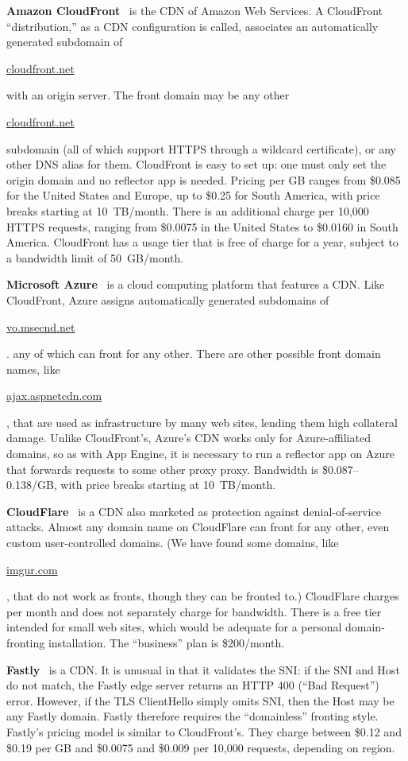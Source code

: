 \documentclass{sig-alternate}
\def\urll#1{\begin{NoHyper}\url{#1}\end{NoHyper}}
\begin{document}
\textbf{Amazon CloudFront}~\cite{cloudfront}
is the CDN of Amazon Web Services.
A CloudFront ``distribution,'' as a CDN configuration is called, associates
an automatically generated subdomain of \urll{cloudfront.net}
with an origin server.
The front domain may be any other \urll{cloudfront.net} subdomain
(all of which support HTTPS through a wildcard certificate),
or any other DNS alias for them.
CloudFront is easy to set up:
one must only set the origin domain and no reflector app is needed.
Pricing per GB ranges from \$0.085 for the United States and Europe,
up to \$0.25 for South America,
with price breaks starting at 10~TB/month.
There is an additional charge per 10,000 HTTPS requests,
ranging from \$0.0075 in the United States
to \$0.0160 in South America.
CloudFront has a usage tier that is free of charge for a year,
subject to a bandwidth limit of 50~GB/month.

\textbf{Microsoft Azure}~\cite{azure}
is a cloud computing platform that features a CDN.
Like CloudFront, Azure assigns automatically generated subdomains
of \urll{vo.msecnd.net}.
any of which can front for any other.
There are other possible front domain names, like \urll{ajax.aspnetcdn.com},
that are used as infrastructure by many web sites,
lending them high collateral damage.
Unlike CloudFront's, Azure's CDN works only for Azure-affiliated domains,
so as with App Engine, it is necessary to run a reflector app on Azure
that forwards requests to some other proxy proxy.
Bandwidth is \$0.087--0.138/GB, with price breaks starting at 10~TB/month.

\textbf{CloudFlare}~\cite{cloudflare}
is a CDN also marketed as protection against
denial-of-service attacks.
Almost any domain name on CloudFlare
can front for any other, even custom user-controlled domains.
(We have found some domains, like \urll{imgur.com},
that do not work as fronts, though they can be fronted to.)
CloudFlare charges per month and does not separately charge for bandwidth.
There is a free tier intended for small web sites,
which would be adequate for a personal domain-fronting installation.
The ``business'' plan is \$200/month.

\textbf{Fastly}~\cite{fastly} is a CDN.
It is unusual in that it validates the SNI:
if the SNI and Host do not match,
the Fastly edge server returns an HTTP 400 (``Bad Request'') error.
However, if the TLS ClientHello simply omits SNI, then the Host may be any Fastly domain.
Fastly therefore requires the ``domainless'' fronting style.
Fastly's pricing model is similar to CloudFront's.
They charge between \$0.12 and \$0.19 per GB
and \$0.0075 and \$0.009 per 10,000 requests, depending on region.
\end{document}
